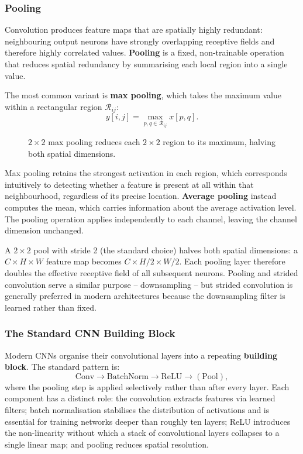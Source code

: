 \subsubsection{Pooling}

Convolution produces feature maps that are spatially highly redundant: neighbouring output neurons have strongly overlapping receptive fields and therefore highly correlated values. \textbf{Pooling} is a fixed, non-trainable operation that reduces spatial redundancy by summarising each local region into a single value.

The most common variant is \textbf{max pooling}, which takes the maximum value within a rectangular region $\mathcal{R}_{ij}$:
\begin{equation}
    y[i,j] = \max_{p,q \in \mathcal{R}_{ij}} x[p,q].
    \label{eq:maxpool}
\end{equation}

\begin{figure}
    \centering
    \resizebox{0.28\textwidth}{!}{}
    \caption{$2\times2$ max pooling reduces each $2\times2$ region to its maximum, halving both spatial dimensions.}
    \label{fig:maxpool}
\end{figure}

Max pooling retains the strongest activation in each region, which corresponds intuitively to detecting whether a feature is present at all within that neighbourhood, regardless of its precise location. \textbf{Average pooling} instead computes the mean, which carries information about the average activation level. The pooling operation applies independently to each channel, leaving the channel dimension unchanged.

A $2 \times 2$ pool with stride 2 (the standard choice) halves both spatial dimensions: a $C \times H \times W$ feature map becomes $C \times H/2 \times W/2$. Each pooling layer therefore doubles the effective receptive field of all subsequent neurons. Pooling and strided convolution serve a similar purpose -- downsampling -- but strided convolution is generally preferred in modern architectures because the downsampling filter is learned rather than fixed.

\subsubsection{The Standard CNN Building Block}

Modern CNNs organise their convolutional layers into a repeating \textbf{building block}. The standard pattern is:
\[
    \text{Conv} \to \text{BatchNorm} \to \text{ReLU} \to (\text{Pool}),
\]
where the pooling step is applied selectively rather than after every layer. Each component has a distinct role: the convolution extracts features via learned filters; batch normalisation stabilises the distribution of activations and is essential for training networks deeper than roughly ten layers; ReLU introduces the non-linearity without which a stack of convolutional layers collapses to a single linear map; and pooling reduces spatial resolution.

